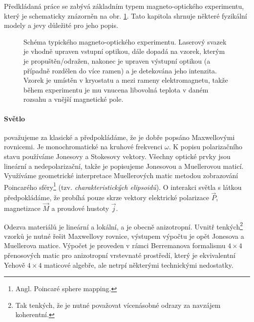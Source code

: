 Předkládaná práce se zabývá základním typem magneto-optického experimentu, který je schematicky znázorněn na obr. \ref{fig:uvodni-diagram}.
Tato kapitola shrnuje některé fyzikální modely a jevy důležité pro jeho popis.

\begin{figure}[htbp]
    \centering
    
    \caption{Schéma typického magneto-optického experimentu. 
    Laserový svazek je vhodně upraven vstupní optikou, dále dopadá na vzorek, kterým je propuštěn/odražen, nakonec je upraven výstupní optikou (a případně rozdělen do více ramen) a je detekována jeho intenzita. 
    Vzorek je umístěn v kryostatu a mezi rameny elektromagnetu, takže během experimentu je mu vnucena libovolná teplota v daném rozsahu a vnější magnetické pole.}
    \label{fig:uvodni-diagram}
\end{figure}


\paragraph{Světlo}
považujeme za klasické a předpokládáme, že je dobře popsáno Maxwellovými rovnicemi.
Je monochromatické na kruhové frekvenci $\omega$.
K popisu polarizačního stavu používáme Jonesovy a Stokesovy vektory.
Všechny optické prvky jsou lineární a nedepolarizační, takže je popisujeme Jonesovou a Muellerovou maticí\cite{gilReviewMuellerMatrix2014}.
Využíváme geometrické interpretace Muellerových matic metodou zobrazování Poincarého sféry\footnote{Angl. Poincaré sphere mapping.} (tzv. \emph{charakteristických elipsoidů})\cite{gilReviewMuellerMatrix2014,ossikovskiPoincareSphereMapping2013}.
O interakci světla s látkou předpokládáme, že probíhá pouze skrze vektory elektrické polarizace $\vec{P}$, magnetizace $\vec{M}$ a proudové hustoty $\vec{j}$. 

Odezva materiálů je lineární a lokální, a je obecně anizotropní. 
Uvnitř tenkých\footnote{Tak tenkých, že je nutné považovat vícenásobné odrazy za navzájem koherentní.} vzorků je nutné řešit Maxwellovy rovnice, výstupem výpočtu je opět Jonesova a Muellerova matice.
Výpočet je proveden v rámci Berremanova formalismu\cite{berremanOpticsStratifiedAnisotropic1972} $4\times 4$ přenosových matic pro anizotropní vrstevnaté prostředí, který je ekvivalentní Yehově $4\times 4$ maticové algebře\cite{yehElectromagneticPropagationBirefringent1979}, ale netrpí některými technickými nedostatky\cite{xuOpticalDegeneraciesAnisotropic2000,wuSingularitiesMatrixFormalisms2018,garibelloSingularityYehTransfer2020,bertrandGeneralAnalyticalTreatment2001}.
        
